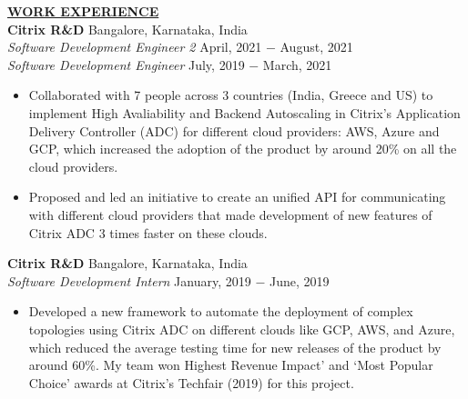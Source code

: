 \documentclass{article}
\begin{document}
% 
%
\noindent \textbf{\underline{WORK EXPERIENCE}} \\
\noindent \textbf{Citrix R\&D} \hfill Bangalore, Karnataka, India \\
\textit{Software Development Engineer 2} \hfill April, 2021 $-$ August, 2021 \\
\textit{Software Development Engineer} \hfill July, 2019 $-$ March, 2021 
\begin{itemize}[noitemsep,nolistsep,leftmargin=*]
\item {Collaborated with 7 people across 3 countries (India, Greece and US) to implement High Avaliability and Backend Autoscaling in Citrix's Application Delivery Controller (ADC) for different cloud providers: AWS, Azure and GCP, which increased the adoption of the product by around 20\% on all the cloud providers.}
\item {Proposed and led an initiative to create an unified API for communicating with different cloud providers that made development of new features of Citrix ADC 3 times faster on these clouds. \\}
\end{itemize}

\noindent \textbf{Citrix R\&D} \hfill Bangalore, Karnataka, India \\
\textit{Software Development Intern} \hfill January, 2019 $-$ June, 2019
\begin{itemize}[noitemsep,nolistsep,leftmargin=*]
\item {Developed a new framework to automate the deployment of complex topologies using Citrix ADC on different clouds like GCP, AWS, and Azure, which reduced the average testing time for new releases of the product by around 60\%. My team won Highest Revenue Impact’ and ‘Most Popular Choice’ awards at Citrix's Techfair (2019) for this project.\\}
\end{itemize}
\end{document}
